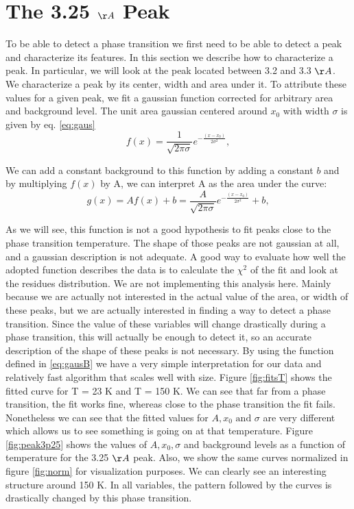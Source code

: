 \section{The 3.25 $\AA$ Peak } \label{Peak}
	To be able to detect a phase transition we first need to be able to detect a peak and characterize its features. In this section we describe how to characterize a peak. In particular, we will look at the peak located between 3.2 and 3.3 ${\AA}$.
	We characterize a peak by its center, width and area under it. To attribute these values for a given peak, we fit a gaussian function corrected for arbitrary area and background level. The unit area gaussian centered around $x_{0}$ with width $\sigma$ is given by eq. \ref{eq:gaus}
	\begin{equation} \label{eq:gaus}
	f(x) = \frac{1}{\sqrt{2\pi \sigma}} e^{-\frac{(x - x_{0})}{2\sigma^{2}} },
	\end{equation}
	
	We can add a constant background to this function by adding a constant $b$ and by multiplying $f(x)$ by A, we can interpret A as the area under the curve:
	\begin{equation} \label{eq:gausB}
	g(x) = Af(x) + b = \frac{A}{\sqrt{2\pi \sigma}} e^{-\frac{(x - x_{0})}{2\sigma^{2}} } + b,
	\end{equation}
	
	As we will see, this function is not a good hypothesis to fit peaks close to the phase transition temperature. The shape of those peaks are not gaussian at all, and a gaussian description is not adequate. A good way to evaluate how well the adopted function describes the data is to calculate the $\chi^{2}$ of the fit and look at the residues distribution. We are not implementing this analysis here. Mainly because we are actually not interested in the actual value of the area, or width of these peaks, but we are actually interested in finding a way to detect a phase transition. 
	Since the value of these variables will change drastically during a phase transition, this will actually be enough to detect it, so an accurate description of the shape of these peaks is not necessary. By using the function defined in \ref{eq:gausB} we have a very simple interpretation for our data and relatively fast algorithm that scales well with size.
	Figure \ref{fig:fitsT} shows the fitted curve for T = 23 K and T = 150 K. We can see that far from a phase transition, the fit works fine, whereas close to the phase transition the fit fails. Nonetheless we can see that the fitted values for $A, x_{0} \textrm{ and } \sigma$ are very different which allows us to see something is going on at that temperature.
	Figure \ref{fig:peak3p25} shows the values of $A, x_{0}, \sigma$ and background levels as a function of temperature for the 3.25 $\AA$ peak. Also, we show the same curves normalized in figure \ref{fig:norm} for visualization purposes.
	We can clearly see an interesting structure around 150 K. In all variables, the pattern followed by the curves is drastically changed by this phase transition.
	
